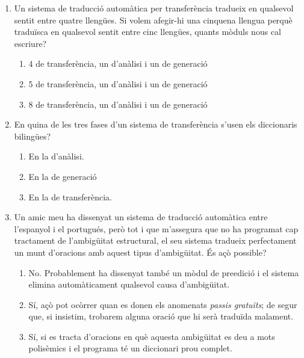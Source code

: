 \begin{enumerate}

\item Un sistema de traducció automàtica per transferència tradueix en
  qualsevol sentit entre quatre llengües. Si volem afegir-hi una
  cinquena llengua perquè traduïsca en qualsevol sentit entre cinc
  llengües, quants mòduls nous cal escriure?
  \begin{enumerate}
  \item 4 de transferència, un d'anàlisi i un de generació
  \item 5 de transferència, un d'anàlisi i un de generació
  \item 8 de transferència, un d'anàlisi i un de generació
  \end{enumerate}

\item En quina de les tres fases d'un sistema de transferència s'usen
  els diccionaris bilingües?
  \begin{enumerate}
  \item En la d'anàlisi.
  \item En la de generació
  \item En la de transferència.
  \end{enumerate}

\item Un amic meu ha dissenyat un sistema de traducció automàtica
  entre l'espanyol i el portugués, però tot i que m'assegura que no ha
  programat cap tractament de l'ambigüitat estructural, el seu sistema
  tradueix perfectament un munt d'oracions amb aquest tipus 
  d'ambigüitat. És açò possible?
  \begin{enumerate}
  \item No. Probablement ha dissenyat també un mòdul de preedició i el
    sistema elimina automàticament qualsevol causa d'ambigüitat.
  \item Sí, açò pot ocòrrer quan es donen els anomenats \emph{passis
      gratuïts}; de segur que, si insistim, trobarem alguna oració que
    hi serà traduïda malament.
  \item Sí, si es tracta d'oracions en què aquesta ambigüitat es deu
    a mots polisèmics i el programa té un diccionari prou complet.
  \end{enumerate}


\end{enumerate}

